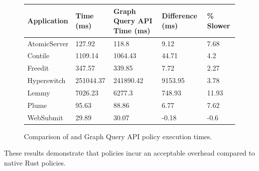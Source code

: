 \begin{figure}
    \begin{tabular}{|l|p{3cm}|p{3.5cm}|p{2cm}|p{3cm}|}
        \hline
        \textbf{Application} & \textbf{\syslang{} Time (ms)} & \textbf{Graph Query API Time (ms)} & \textbf{Difference (ms)} & \textbf{\syslang{} \% Slower} \\ \hline
        AtomicServer & 127.92    & 118.8     & 9.12    & 7.68  \\ \hline
        Contile      & 1109.14   & 1064.43   & 44.71   & 4.2   \\ \hline
        Freedit      & 347.57    & 339.85    & 7.72    & 2.27  \\ \hline
        Hyperswitch  & 251044.37 & 241890.42 & 9153.95 & 3.78  \\ \hline
        Lemmy        & 7026.23   & 6277.3    & 748.93  & 11.93 \\ \hline
        Plume        & 95.63     & 88.86     & 6.77    & 7.62  \\ \hline
        WebSubmit    & 29.89     & 30.07     & -0.18   & -0.6  \\ \hline               
        \end{tabular}
        \caption{Comparison of \syslang{} and Graph Query API policy execution times.}
\end{figure}
%
These results demonstrate that \syslang{} policies incur an acceptable overhead compared to native Rust policies.
